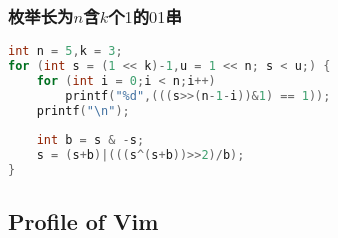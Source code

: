 	\subsubsection{枚举长为$n$含$k$个$1$的$01$串}
	\begin{lstlisting}[language=c++]
int n = 5,k = 3;
for (int s = (1 << k)-1,u = 1 << n; s < u;) {
	for (int i = 0;i < n;i++)
		printf("%d",(((s>>(n-1-i))&1) == 1));
	printf("\n");
	
	int b = s & -s;
	s = (s+b)|(((s^(s+b))>>2)/b);
}
	\end{lstlisting}

\subsection{Profile of Vim}

